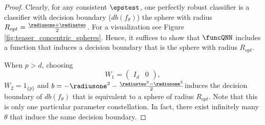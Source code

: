 \begin{proof}
  Clearly, for any consistent $\epstest$, one perfectly robust classifier is a classifier with decision boundary ($db\left(f_{\theta}\right)$) the sphere with radius $R_{opt} = \frac{\radiusone+\radiustwo}{2}$. For a visualization see Figure \ref{fig:teaser_concentric_spheres}. Hence, it suffices to show that $\funcQNN$ includes a function that induces a decision boundary
  that is the sphere with radius $R_{opt}$.


When $p>d$, choosing
\begin{equation*}
    W_1 = \begin{pmatrix}
I_d & 0
\end{pmatrix},
\end{equation*}
$W_2 = 1_{\{p\}}$ and $b = -\radiusone^2-\frac{\radiustwo^2-\radiusone^2}{2}$induces the decision boundary of $db\left(f_{\theta}\right)$ that is equivalent to a sphere of radius $R_{opt}$.
Note that this is only one particular parameter constellation. In fact, there exist infinitely many $\theta$ that induce the same decision boundary.
\end{proof}




